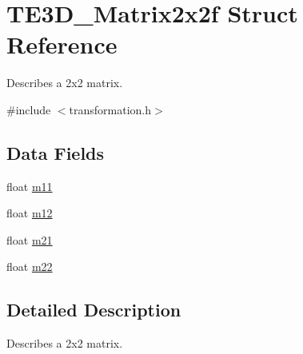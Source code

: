 \hypertarget{struct_t_e3_d___matrix2x2f}{\section{T\-E3\-D\-\_\-\-Matrix2x2f Struct Reference}
\label{struct_t_e3_d___matrix2x2f}
}


Describes a 2x2 matrix.  




{\ttfamily \#include $<$transformation.\-h$>$}

\subsection*{Data Fields}
\begin{DoxyCompactItemize}
\item 
float \hyperlink{struct_t_e3_d___matrix2x2f_a02c16113c6c4ce99349a1dc82bdc21cc}{m11}
\item 
float \hyperlink{struct_t_e3_d___matrix2x2f_aec316cfb9b53d085372bf0cd0c769af1}{m12}
\item 
float \hyperlink{struct_t_e3_d___matrix2x2f_a7f8222cebbd5007d7b56d367d0a6ab2a}{m21}
\item 
float \hyperlink{struct_t_e3_d___matrix2x2f_a3f6c71e06ae8d5e18af7c50f20b0acd6}{m22}
\end{DoxyCompactItemize}


\subsection{Detailed Description}
Describes a 2x2 matrix. 

